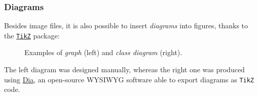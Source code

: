 \documentclass[10pt,    %
    english,            %
    xcolor=table,       %
    envcountsect,       %
    aspectratio=43      %
]{beamer}
\begin{document}
\begin{frame}
\end{frame}

\begin{frame}
    \label{sli:Diagrams}
    \frametitle{Diagrams}
    
    Besides image files, it is also possible to insert \textit{diagrams} into figures, thanks to the \href{https://ctan.org/pkg/pgf?lang=en}{\texttt{TikZ}} package:
    
    \vspace{-0.20cm}
    \begin{figure}[H]
        \centering
        \resizebox{0.35\linewidth}{!}{}
        \hspace{0.25cm}\hspace{0.25cm}
        \resizebox{0.45\linewidth}{!}{}
        \vspace{-0.10cm}
        \caption{Examples of \textit{graph} (left) and \textit{class diagram} (right).}
        \label{fig:diagrams}
    \end{figure}
    
    \vspace{-0.50cm}
    The left diagram was designed manually, whereas the right one was produced using \href{http://dia-installer.de}{Dia}, an open-source WYSIWYG software able to export diagrams as \texttt{TikZ} code.
    
    
\end{frame}
    
\end{document}
